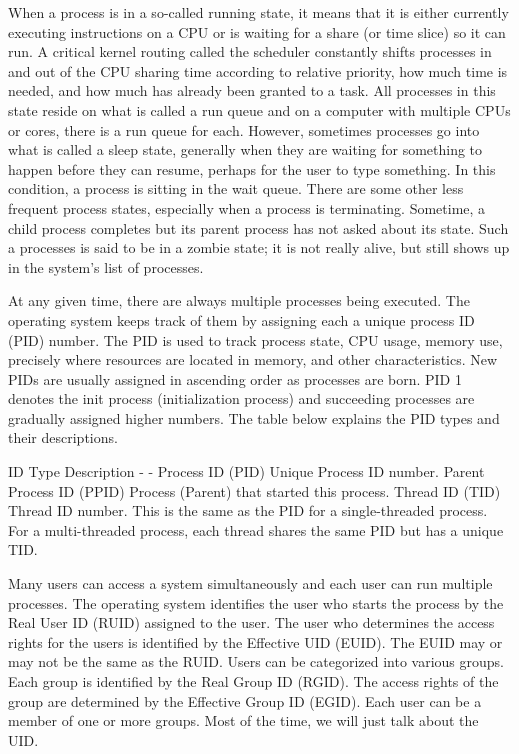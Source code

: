 When a process is in a so-called running state, it means that it is
either currently executing instructions on a CPU or is waiting for a
share (or time slice) so it can run. A critical kernel routing called
the scheduler constantly shifts processes in and out of the CPU sharing
time according to relative priority, how much time is needed, and how
much has already been granted to a task. All processes in this state
reside on what is called a run queue and on a computer with multiple
CPUs or cores, there is a run queue for each. However, sometimes
processes go into what is called a sleep state, generally when they are
waiting for something to happen before they can resume, perhaps for the
user to type something. In this condition, a process is sitting in the
wait queue. There are some other less frequent process states,
especially when a process is terminating. Sometime, a child process
completes but its parent process has not asked about its state. Such a
processes is said to be in a zombie state; it is not really alive, but
still shows up in the system's list of processes.

At any given time, there are always multiple processes being executed.
The operating system keeps track of them by assigning each a unique
process ID (PID) number. The PID is used to track process state, CPU
usage, memory use, precisely where resources are located in memory, and
other characteristics. New PIDs are usually assigned in ascending order
as processes are born. PID 1 denotes the init process (initialization
process) and succeeding processes are gradually assigned higher numbers.
The table below explains the PID types and their descriptions.

ID Type \textbar{} Description - \textbar{} - Process ID (PID)
\textbar{} Unique Process ID number. Parent Process ID (PPID) \textbar{}
Process (Parent) that started this process. Thread ID (TID) \textbar{}
Thread ID number. This is the same as the PID for a single-threaded
process. For a multi-threaded process, each thread shares the same PID
but has a unique TID.

Many users can access a system simultaneously and each user can run
multiple processes. The operating system identifies the user who starts
the process by the Real User ID (RUID) assigned to the user. The user
who determines the access rights for the users is identified by the
Effective UID (EUID). The EUID may or may not be the same as the RUID.
Users can be categorized into various groups. Each group is identified
by the Real Group ID (RGID). The access rights of the group are
determined by the Effective Group ID (EGID). Each user can be a member
of one or more groups. Most of the time, we will just talk about the
UID.

